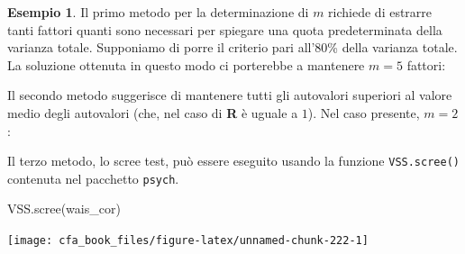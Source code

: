 \documentclass[
  11pt,
]{krantz}
\makeatletter
\newenvironment{Shaded}{\begin{snugshade}}{\end{snugshade}}
\newcommand{\CommentTok}[1]{\textcolor[rgb]{0.37,0.37,0.37}{\textit{#1}}}
\newcommand{\DecValTok}[1]{\textcolor[rgb]{0.06,0.06,0.06}{#1}}
\newcommand{\FunctionTok}[1]{\textcolor[rgb]{0,0,0}{#1}}
\newcommand{\NormalTok}[1]{#1}
\newcommand{\OtherTok}[1]{\textcolor[rgb]{0.37,0.37,0.37}{#1}}
\newcommand{\SpecialCharTok}[1]{\textcolor[rgb]{0,0,0}{#1}}
\newenvironment{kframe}{%
\medskip{}
\setlength{\fboxsep}{.8em}
 \def\at@end@of@kframe{}%
 \ifinner\ifhmode%
  \def\at@end@of@kframe{\end{minipage}}%
  \begin{minipage}{\columnwidth}%
 \fi\fi%
 \def\FrameCommand##1{\hskip\@totalleftmargin \hskip-\fboxsep
 \colorbox{shadecolor}{##1}\hskip-\fboxsep
     \hskip-\linewidth \hskip-\@totalleftmargin \hskip\columnwidth}%
 \MakeFramed {\advance\hsize-\width
   \@totalleftmargin\z@ \linewidth\hsize
   \@setminipage}}%
 {\par\unskip\endMakeFramed%
 \at@end@of@kframe}
\renewenvironment{Shaded}{\begin{kframe}}{\end{kframe}}
\theoremstyle{definition}
\theoremstyle{definition}
\newtheorem{example}{Esempio}[chapter]
\theoremstyle{definition}
\theoremstyle{definition}
\theoremstyle{remark}
\makeatother
\begin{document}
\begin{example}
Il primo metodo per la determinazione di \(m\) richiede di estrarre tanti fattori quanti sono necessari per spiegare una quota predeterminata della varianza totale. Supponiamo di porre il criterio pari all'80\% della varianza totale. La soluzione ottenuta in questo modo ci porterebbe a mantenere \(m=5\) fattori:

\begin{Shaded}
\end{Shaded}

Il secondo metodo suggerisce di mantenere tutti gli autovalori superiori al valore medio degli autovalori (che, nel caso di \textbf{R} è uguale a \(1\)). Nel caso presente, \(m=2\):

\begin{Shaded}
\end{Shaded}

Il terzo metodo, lo scree test, può essere eseguito usando la funzione \texttt{VSS.scree()} contenuta nel pacchetto \texttt{psych}.

\begin{Shaded}
\begin{Highlighting}[]
\FunctionTok{VSS.scree}\NormalTok{(wais\_cor)}
\end{Highlighting}
\end{Shaded}

\begin{center}\texttt{[image: cfa\_book\_files/figure-latex/unnamed-chunk-222-1]} \end{center}


\end{example}
\end{document}
